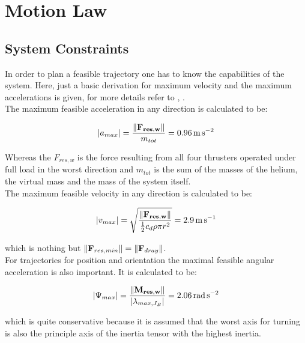 \section{Motion Law}
\label{sec:motionLaw}
\subsection{System Constraints}
\label{subsec:systemConstraints}
In order to plan a feasible trajectory one has to know the capabilities of the system. Here, just a basic derivation for maximum velocity and the maximum accelerations is given, for more details refer to \cite{weichart}, \cite{schaffnervu}. \\

The maximum feasible acceleration in any direction is calculated to be:

\begin{equation}
  \left|a_{max} \right| =  \frac{\| {\bf F_{res, w}}\|}{m_{tot}} = \SI{0.96}{\meter\per\square\second}
\end{equation}

Whereas the $F_{res,w}$ is the force resulting from all four thrusters operated under full load in the worst direction and $m_{tot}$ is the sum of the masses of the helium, the virtual mass and the mass of the system itself.\\


The maximum feasible velocity in any direction is calculated to be:

\begin{equation}
\left|v_{max} \right| = \sqrt{\frac{\|{\bf F_{res,w}} \|}{\frac{1}{2}c_d \rho \pi r^2}}=\SI{2.9}{\meter\per\second}
\end{equation}

which is nothing but $ \|{\bf F}_{res,min} \| = \|{\bf F}_{dray} \| $.\\

For trajectories for position and orientation the maximal feasible angular acceleration is also important. It is calculated to be:

\begin{equation}
\left|\Psi_{max} \right| =  \frac{\| {\bf M_{res,w}}\|}{\left| \lambda_{max, J_{B}} \right|} = \SI{2.06}{\radian\per\square\second}
\end{equation}

which is quite conservative because it is assumed that the worst axis for turning is also the principle axis of the inertia tensor with the highest inertia.\\

